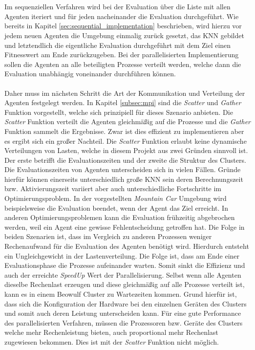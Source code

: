 \\\\
Im sequenziellen Verfahren wird bei der Evaluation über die Liste mit allen Agenten iteriert und für jeden nacheinander die Evaluation durchgeführt. Wie bereits in Kapitel \ref{sec:sequential_implementation} beschrieben, wird hierzu vor jedem neuen Agenten die Umgebung einmalig zurück gesetzt, das \ac{KNN} gebildet und letztendlich die eigentliche Evaluation durchgeführt mit dem Ziel einen Fitnesswert am Ende zurückzugeben. Bei der parallelisierten Implementierung sollen die Agenten an alle beteiligten Prozesse verteilt werden, welche dann die Evaluation unabhängig voneinander durchführen können. 
\\\\
Daher muss im nächsten Schritt die Art der Kommunikation und Verteilung der Agenten festgelegt werden. In Kapitel \ref{subsec:mpi} sind die \emph{Scatter} und \emph{Gather} Funktion vorgestellt, welche sich prinzipiell für dieses Szenario anbieten. Die \emph{Scatter} Funktion verteilt die Agenten gleichmäßig auf die Prozesse und die \emph{Gather} Funktion sammelt die Ergebnisse. Zwar ist dies effizient zu implementieren aber es ergibt sich ein großer Nachteil. Die \emph{Scatter} Funktion erlaubt keine dynamische Verteilungen von Lasten, welche in diesem Projekt aus zwei Gründen sinnvoll ist. Der erste betrifft die Evaluationszeiten und der zweite die Struktur des Clusters. Die Evaluationszeiten von Agenten unterscheiden sich in vielen Fällen. Gründe hierfür können einerseits unterschiedlich große \ac{KNN} sein deren Berechnungszeit bzw. Aktivierungszeit variiert aber auch unterschiedliche Fortschritte im Optimierungsproblem. In der vorgestellten \emph{Mountain Car} Umgebung wird beispielsweise die Evaluation beendet, wenn der Agent das Ziel erreicht. In anderen Optimierungsproblemen kann die Evaluation frühzeitig abgebrochen werden, weil ein Agent eine gewisse Fehlentscheidung getroffen hat. Die Folge in beiden Szenarien ist, dass im Vergleich zu anderen Prozessen weniger Rechenaufwand für die Evaluation des Agenten benötigt wird. Hierdurch entsteht ein Ungleichgewicht in der Lastenverteilung. Die Folge ist, dass am Ende einer Evaluationsphase die Prozesse aufeinander warten. Somit sinkt die Effizienz und auch der erreichte \emph{SpeedUp} Wert der Parallelisierung. Selbst wenn alle Agenten dieselbe Rechenlast erzeugen und diese gleichmäßig auf alle Prozesse verteilt ist, kann es in einem Beowulf Cluster zu Wartezeiten kommen. Grund hierfür ist, dass sich die Konfiguration der Hardware bei den einzelnen Geräten des Clusters und somit auch deren Leistung unterscheiden kann. Für eine gute Performance des parallelisierten Verfahren, müssen die Prozessoren bzw. Geräte des Clusters welche mehr Rechenleistung bieten, auch proportional mehr Rechenlast zugewiesen bekommen. Dies ist mit der \emph{Scatter} Funktion nicht möglich.
